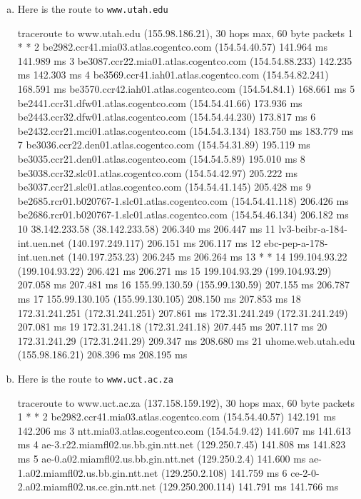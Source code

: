 \begin{enumerate}[a.]
\item Here is the route to {\tt www.utah.edu}
\begin{code}
traceroute to www.utah.edu (155.98.186.21), 30 hops max, 60 byte packets
 1  * *
 2  be2982.ccr41.mia03.atlas.cogentco.com (154.54.40.57)  141.964 ms  141.989 ms
 3  be3087.ccr22.mia01.atlas.cogentco.com (154.54.88.233)  142.235 ms  142.303 ms
 4  be3569.ccr41.iah01.atlas.cogentco.com (154.54.82.241)  168.591 ms be3570.ccr42.iah01.atlas.cogentco.com (154.54.84.1)  168.661 ms
 5  be2441.ccr31.dfw01.atlas.cogentco.com (154.54.41.66)  173.936 ms be2443.ccr32.dfw01.atlas.cogentco.com (154.54.44.230)  173.817 ms
 6  be2432.ccr21.mci01.atlas.cogentco.com (154.54.3.134)  183.750 ms  183.779 ms
 7  be3036.ccr22.den01.atlas.cogentco.com (154.54.31.89)  195.119 ms be3035.ccr21.den01.atlas.cogentco.com (154.54.5.89)  195.010 ms
 8  be3038.ccr32.slc01.atlas.cogentco.com (154.54.42.97)  205.222 ms be3037.ccr21.slc01.atlas.cogentco.com (154.54.41.145)  205.428 ms
 9  be2685.rcr01.b020767-1.slc01.atlas.cogentco.com (154.54.41.118)  206.426 ms be2686.rcr01.b020767-1.slc01.atlas.cogentco.com (154.54.46.134)  206.182 ms
10  38.142.233.58 (38.142.233.58)  206.340 ms  206.447 ms
11  lv3-beibr-a-184-int.uen.net (140.197.249.117)  206.151 ms  206.117 ms
12  ebc-pep-a-178-int.uen.net (140.197.253.23)  206.245 ms  206.264 ms
13  * *
14  199.104.93.22 (199.104.93.22)  206.421 ms  206.271 ms
15  199.104.93.29 (199.104.93.29)  207.058 ms  207.481 ms
16  155.99.130.59 (155.99.130.59)  207.155 ms  206.787 ms
17  155.99.130.105 (155.99.130.105)  208.150 ms  207.853 ms
18  172.31.241.251 (172.31.241.251)  207.861 ms 172.31.241.249 (172.31.241.249)  207.081 ms
19  172.31.241.18 (172.31.241.18)  207.445 ms  207.117 ms
20  172.31.241.29 (172.31.241.29)  209.347 ms  208.680 ms
21  uhome.web.utah.edu (155.98.186.21)  208.396 ms  208.195 ms
\end{code}
\clearpage
\item Here is the route to {\tt www.uct.ac.za}
\begin{code}
traceroute to www.uct.ac.za (137.158.159.192), 30 hops max, 60 byte packets
 1  * *
 2  be2982.ccr41.mia03.atlas.cogentco.com (154.54.40.57)  142.191 ms  142.206 ms
 3  ntt.mia03.atlas.cogentco.com (154.54.9.42)  141.607 ms  141.613 ms
 4  ae-3.r22.miamfl02.us.bb.gin.ntt.net (129.250.7.45)  141.808 ms  141.823 ms
 5  ae-0.a02.miamfl02.us.bb.gin.ntt.net (129.250.2.4)  141.600 ms ae-1.a02.miamfl02.us.bb.gin.ntt.net (129.250.2.108)  141.759 ms
 6  ce-2-0-2.a02.miamfl02.us.ce.gin.ntt.net (129.250.200.114)  141.791 ms  141.766 ms

\end{code}
\end{enumerate}

